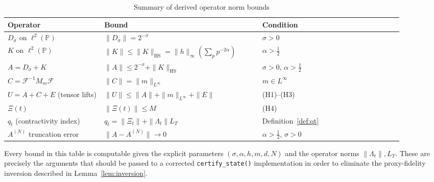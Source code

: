 \documentclass[11pt]{article}
\begin{document}
\begin{table}[h!]
\centering
\caption{Summary of derived operator norm bounds}
\begin{tabular}{p{0.22\linewidth} p{0.36\linewidth} p{0.32\linewidth}}
\toprule
\textbf{Operator} & \textbf{Bound} & \textbf{Condition} \\
\midrule
$D_{\sigma}$ on $\ell^{2}(\mathbb{P})$
& $\|D_{\sigma}\|=2^{-\sigma}$
& $\sigma>0$ \\[4pt]
$K$ on $\ell^{2}(\mathbb{P})$
& $\|K\|\leq\|K\|_{\mathrm{HS}}=\|h\|_{\infty}\!\left(\sum_{p}p^{-2\alpha}\right)$
& $\alpha>\tfrac{1}{2}$ \\[4pt]
$A=D_{\sigma}+K$
& $\|A\|\leq 2^{-\sigma}+\|K\|_{\mathrm{HS}}$
& $\sigma>0,\,\alpha>\tfrac{1}{2}$ \\[4pt]
$C=\mathcal{F}^{-1}M_{m}\mathcal{F}$
& $\|C\|=\|m\|_{L^{\infty}}$
& $m\in L^{\infty}$ \\[4pt]
$U=A+C+E$ (tensor lifts)
& $\|U\|\leq\|A\|+\|m\|_{L^{\infty}}+\|E\|$
& (H1)--(H3) \\[4pt]
$\Xi(t)$
& $\|\Xi(t)\|\leq M$
& (H4) \\[4pt]
$q_{t}$ (contractivity index)
& $q_{t}=\|\Xi_{t}\|+\|\Lambda_{t}\|L_{T}$
& Definition~\ref{def:qt} \\[4pt]
$A^{(N)}$ truncation error
& $\|A-A^{(N)}\|\to 0$
& $\alpha>\tfrac{1}{2},\,\sigma>0$ \\[4pt]
\bottomrule
\end{tabular}
\end{table}

\begin{remark}
Every bound in this table is computable given the explicit parameters
$(\sigma,\alpha,h,m,d,N)$ and the operator norms $\|\Lambda_{t}\|,L_{T}$.
These are precisely the arguments that should be passed to a corrected
\texttt{certify\_state()} implementation in order to eliminate the
proxy-fidelity inversion described in Lemma~\ref{lem:inversion}.
\end{remark}

\nocite{*}
  

\end{document}
